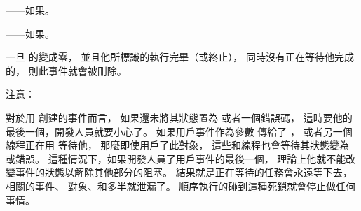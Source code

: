 \item {}——如果\scdevfailres。

\item {}——如果\schostfailres。
\stopigBase

一旦  的變成零，
並且他所標識的執行完畢（或終止），
同時沒有正在等待他完成的，
則此事件就會被刪除。

注意：

對於用  創建的事件而言，
如果還未將其狀態置為  或者一個錯誤碼，
這時要他的最後一個，開發人員就要小心了。
如果用戶事件作為參數  傳給了 ，
或者另一個線程正在用  等待他，
那麼即使用戶了此對象，
這些和線程也會等待其狀態變為  或錯誤。
這種情況下，如果開發人員了用戶事件的最後一個，
理論上他就不能改變事件的狀態以解除其他部分的阻塞。
結果就是正在等待的任務會永遠等下去，
相關的事件、  對象、和多半就泄漏了。
順序執行的碰到這種死鎖就會停止做任何事情。

